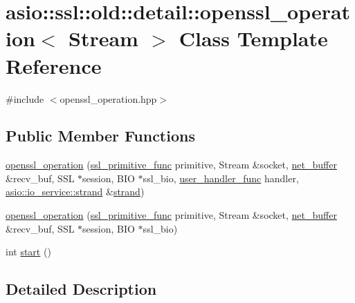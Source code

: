 \hypertarget{classasio_1_1ssl_1_1old_1_1detail_1_1openssl__operation}{}\section{asio\+:\+:ssl\+:\+:old\+:\+:detail\+:\+:openssl\+\_\+operation$<$ Stream $>$ Class Template Reference}
\label{classasio_1_1ssl_1_1old_1_1detail_1_1openssl__operation}


{\ttfamily \#include $<$openssl\+\_\+operation.\+hpp$>$}

\subsection*{Public Member Functions}
\begin{DoxyCompactItemize}
\item 
\hyperlink{classasio_1_1ssl_1_1old_1_1detail_1_1openssl__operation_a54ef0e892487a10547759fde113f63e1}{openssl\+\_\+operation} (\hyperlink{namespaceasio_1_1ssl_1_1old_1_1detail_ac338e0197f7b92011daad86db7d838ba}{ssl\+\_\+primitive\+\_\+func} primitive, Stream \&socket, \hyperlink{classasio_1_1ssl_1_1old_1_1detail_1_1net__buffer}{net\+\_\+buffer} \&recv\+\_\+buf, S\+S\+L $\ast$session, B\+I\+O $\ast$ssl\+\_\+bio, \hyperlink{namespaceasio_1_1ssl_1_1old_1_1detail_adb21335c4883c670ec54bece575120eb}{user\+\_\+handler\+\_\+func} handler, \hyperlink{classasio_1_1io__service_1_1strand}{asio\+::io\+\_\+service\+::strand} \&\hyperlink{namespaceasio_a3be3fa00c86ab58ba41aabe8fcbf11be}{strand})
\item 
\hyperlink{classasio_1_1ssl_1_1old_1_1detail_1_1openssl__operation_aecb9155902fa79c692c3e7b0fe4c28c7}{openssl\+\_\+operation} (\hyperlink{namespaceasio_1_1ssl_1_1old_1_1detail_ac338e0197f7b92011daad86db7d838ba}{ssl\+\_\+primitive\+\_\+func} primitive, Stream \&socket, \hyperlink{classasio_1_1ssl_1_1old_1_1detail_1_1net__buffer}{net\+\_\+buffer} \&recv\+\_\+buf, S\+S\+L $\ast$session, B\+I\+O $\ast$ssl\+\_\+bio)
\item 
int \hyperlink{classasio_1_1ssl_1_1old_1_1detail_1_1openssl__operation_a0ce775c786d8f766f9af9e10a5507129}{start} ()
\end{DoxyCompactItemize}


\subsection{Detailed Description}

